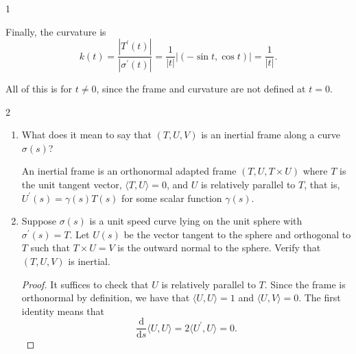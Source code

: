 \documentclass[11pt]{article}
\begin{document}
\begin{problem}{1}
\begin{enumerate}[label=(\alph*)]
\begin{answer}
			      Finally, the curvature is
			      \begin{equation}
				      \label{eq:17}
				      k(t) = \frac{| T^{\prime}(t) |}{| \sigma^{\prime}(t) |} = \frac{1}{|t|} \left|(-\sin t, \cos t)\right| = \frac{1}{|t|}.
			      \end{equation}

			      All of this is for \( t \neq 0 \), since the frame and curvature are not defined at \( t = 0 \).
		      \end{answer}
	\end{enumerate}
\end{problem}

\begin{problem}{2}\hfill
	\begin{enumerate}[label=(\alph*)]
		\item What does it mean to say that \( (T,U,V) \) is an inertial frame along a curve \(\sigma(s)\)?
		      \begin{answer}
			      An inertial frame is an orthonormal adapted frame \( (T, U, T \times U) \) where \( T \) is the unit tangent vector, \( \langle T, U \rangle = 0 \), and \( U \) is relatively parallel to \( T \), that is, \( U^{\prime}(s) = \gamma(s) T(s) \) for some scalar function \(\gamma(s)\).
		      \end{answer}
		\item Suppose \(\sigma(s)\) is a unit speed curve lying on the unit sphere with \(\sigma^{\prime}(s) = T\).
		      Let \( U(s) \) be the vector tangent to the sphere and orthogonal to \( T \) such that \( T \times U = V \) is the outward normal to the sphere.
		      Verify that \( (T,U,V) \) is inertial.
		      \begin{proof}
			      It suffices to check that \( U \) is relatively parallel to \( T \).
			      Since the frame is orthonormal by definition, we have that \(\langle U, U \rangle = 1\) and \( \langle U, V \rangle = 0 \).
			      The first identity means that
			      \begin{equation}
				      \label{eq:8}
				      \frac{\mathrm{d} }{\mathrm{d} s}\langle U, U \rangle = 2 \langle U^{\prime}, U \rangle = 0.
			      \end{equation}


\end{proof}
\end{enumerate}
\end{problem}
\end{document}
